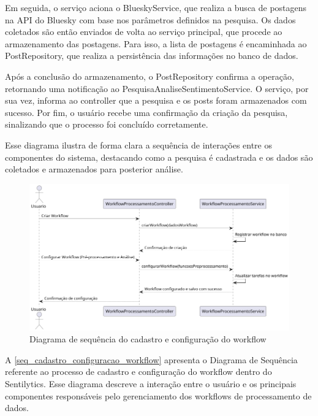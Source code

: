 \documentclass[
	12pt,				%
	oneside,			%
	a4paper,			%
	english,			%
	french,				%
	spanish,			%
	brazil				%
	]{abntex2}
\begin{document}
Em seguida, o serviço aciona o BlueskyService, que realiza a busca de
postagens na API do Bluesky com base nos parâmetros definidos na
pesquisa. Os dados coletados são então enviados de volta ao serviço
principal, que procede ao armazenamento das postagens. Para isso, a
lista de postagens é encaminhada ao PostRepository, que realiza a
persistência das informações no banco de dados.

Após a conclusão do armazenamento, o PostRepository confirma a operação,
retornando uma notificação ao PesquisaAnaliseSentimentoService. O
serviço, por sua vez, informa ao controller que a pesquisa e os posts
foram armazenados com sucesso. Por fim, o usuário recebe uma confirmação
da criação da pesquisa, sinalizando que o processo foi concluído
corretamente.

Esse diagrama ilustra de forma clara a sequência de interações entre os
componentes do sistema, destacando como a pesquisa é cadastrada e os
dados são coletados e armazenados para posterior análise.

\begin{figure}[htbp]
\hypertarget{seq_cadastro_configuracao_workflow}{%
\caption{Diagrama de sequência do cadastro e configuração do workflow}\label{seq_cadastro_configuracao_workflow}
\begin{center}
\includegraphics[scale=0.4]{imagens/sentilytics/diagramas/sequencia-cadastro-configuracao-workflow.png}
\end{center}
}
\end{figure}

A \autoref{seq_cadastro_configuracao_workflow} apresenta o Diagrama de
Sequência referente ao processo de cadastro e configuração do workflow
dentro do Sentilytics. Esse diagrama descreve a interação entre o
usuário e os principais componentes responsáveis pelo gerenciamento dos
workflows de processamento de dados.
\end{document}
